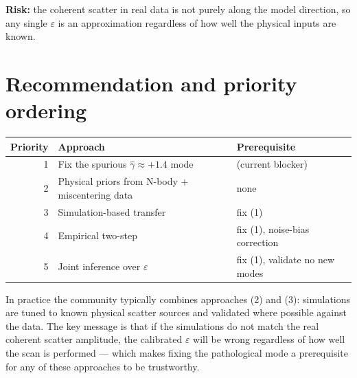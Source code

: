 \documentclass[11pt,a4paper]{article}
\begin{document}
\textbf{Risk:} the coherent scatter in real data is not purely along the
model direction, so any single $\varepsilon$ is an approximation regardless
of how well the physical inputs are known.

\section{Recommendation and priority ordering}

\begin{center}
\begin{tabular}{r l l}
\toprule
Priority & Approach & Prerequisite \\
\midrule
1 & Fix the spurious $\hat\gamma \approx +1.4$ mode & (current blocker) \\
2 & Physical priors from N-body + miscentering data & none \\
3 & Simulation-based transfer & fix (1) \\
4 & Empirical two-step & fix (1), noise-bias correction \\
5 & Joint inference over $\varepsilon$ & fix (1), validate no new modes \\
\bottomrule
\end{tabular}
\end{center}

In practice the community typically combines approaches (2) and (3): simulations
are tuned to known physical scatter sources and validated where possible against
the data.  The key message is that if the simulations do not match the real
coherent scatter amplitude, the calibrated $\varepsilon$ will be wrong
regardless of how well the scan is performed — which makes fixing the
pathological mode a prerequisite for any of these approaches to be trustworthy.
\end{document}
